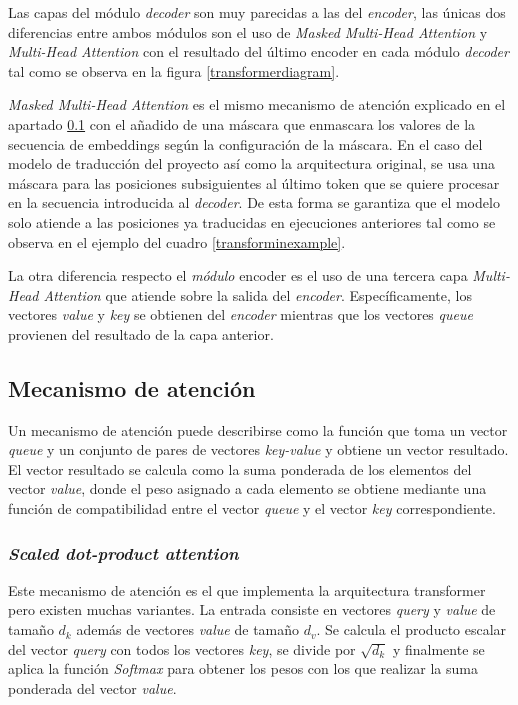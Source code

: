 Las capas del módulo \textit{decoder} son muy parecidas a las del \textit{encoder}, las únicas dos diferencias entre ambos módulos son el uso de \textit{Masked Multi-Head Attention} y \textit{Multi-Head Attention} con el resultado del último encoder en cada módulo \textit{decoder} tal como se observa en la figura \ref{transformerdiagram}.

\textit{Masked Multi-Head Attention} es el mismo mecanismo de atención explicado en el apartado \ref{transfattention} con el añadido de una máscara que enmascara los valores de la secuencia de embeddings según la configuración de la máscara. En el caso del modelo de traducción del proyecto así como la arquitectura original, se usa una máscara para las posiciones subsiguientes al último token que se quiere procesar en la secuencia introducida al \textit{decoder}. De esta forma se garantiza que el modelo solo atiende a las posiciones ya traducidas en ejecuciones anteriores tal como se observa en el ejemplo del cuadro \ref{transforminexample}.

La otra diferencia respecto el \textit{módulo} encoder es el uso de una tercera capa \textit{Multi-Head Attention} que atiende sobre la salida del \textit{encoder}. Específicamente, los vectores \textit{value} y \textit{key} se obtienen del \textit{encoder} mientras que los vectores \textit{queue} provienen del resultado de la capa anterior.

\subsection{Mecanismo de atención}\label{transfattention}
Un mecanismo de atención puede describirse como la función que toma un vector \textit{queue} y un conjunto de pares de vectores \textit{key-value} y obtiene un vector resultado.
El vector resultado se calcula como la suma ponderada de los elementos del vector \textit{value}, donde el peso asignado a cada elemento se obtiene mediante una función de compatibilidad entre el vector \textit{queue} y el vector \textit{key} correspondiente.

\subsubsection{\textit{Scaled dot-product attention}}
Este mecanismo de atención es el que implementa la arquitectura transformer pero existen muchas variantes. La entrada consiste en vectores \textit{query} y \textit{value} de tamaño $d_{k}$ además de vectores \textit{value} de tamaño $d_{v}$. Se calcula el producto escalar del vector \textit{query} con todos los vectores \textit{key}, se divide por $\sqrt{d_{k}}$ y finalmente se aplica la función \textit{Softmax} para obtener los pesos con los que realizar la suma ponderada del vector \textit{value}.


